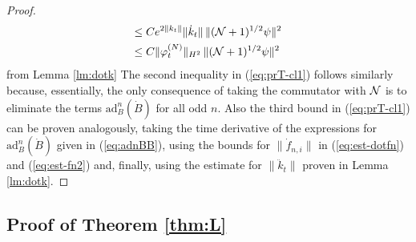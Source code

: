 \documentclass[11pt,a4paper]{article}
\newcommand{\cN}{{\cal N}}
\begin{document}
\begin{proof}
\[\begin{split}
\leq \; & C e^{2\| k_t \|} \| \dot{k}_t \| \, \| (\cN+1)^{1/2} \psi \|^2 \\
\leq \; & C \| \varphi_t^{(N)} \|_{H^2} \, \| (\cN+1)^{1/2} \psi \|^2 
\end{split}
\]
from Lemma \ref{lm:dotk} The second inequality in (\ref{eq:prT-cl1}) follows similarly because, essentially, the only consequence of taking the commutator with $\cN$ is to eliminate the terms $\text{ad}^n_B (\dot{B})$ for all odd $n$. Also the third bound in (\ref{eq:prT-cl1}) can be proven analogously, taking the time derivative of the expressions for $\text{ad}^n_B (\dot{B})$ given in (\ref{eq:adnBB}), using the bounds for $\| \dot f_{n,i} \|$ in (\ref{eq:est-dotfn}) and (\ref{eq:est-fn2}) and, finally, using the estimate for $\| \ddot k_t \|$ proven in Lemma \ref{lm:dotk}.
\end{proof}

\subsection{Proof of Theorem \ref{thm:L}}
\end{document}

